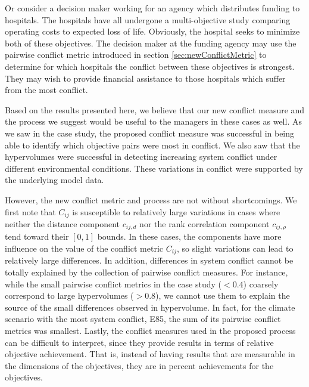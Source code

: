 Or consider a decision maker working for an agency which distributes funding to hospitals. The hospitals have all undergone a multi-objective study comparing operating costs to expected loss of life. Obviously, the hospital seeks to minimize both of these objectives. The decision maker at the funding agency may use the pairwise conflict metric introduced in section \ref{sec:newConflictMetric} to determine for which hospitals the conflict between these objectives is strongest. They may wish to provide financial assistance to those hospitals which suffer from the most conflict.


Based on the results presented here, we believe that our new conflict measure and the process we suggest would be useful to the managers in these cases as well. As we saw in the case study, the proposed conflict measure was successful in being able to identify which objective pairs were most in conflict. We also saw that the hypervolumes were successful in detecting increasing system conflict under different environmental conditions. These variations in conflict were supported by the underlying model data. 

However, the new conflict metric and process are not without shortcomings. We first note that $C_{ij}$ is susceptible to relatively large variations in cases where neither the distance component $c_{ij,d}$ nor the rank correlation component $c_{ij,\rho}$ tend toward their $[0,1]$ bounds. In these cases, the components have more influence on the value of the conflict metric $C_{ij}$, so slight variations can lead to relatively large differences. In addition, differences in system conflict cannot be totally explained by the collection of pairwise conflict measures. For instance, while the small pairwise conflict metrics in the case study ($< 0.4$) coarsely correspond to large hypervolumes ($> 0.8$), we cannot use them to explain the source of the small differences observed in hypervolume. In fact, for the climate scenario with the most system conflict, E85, the sum of its pairwise conflict metrics was smallest. Lastly, the conflict measures used in the proposed process can be difficult to interpret, since they provide results in terms of relative objective achievement. That is, instead of having results that are measurable in the dimensions of the objectives, they are in percent achievements for the objectives.

